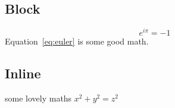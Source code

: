 \documentclass{article}
\begin{document}
  \subsection{Block}

  \begin{equation}
    e^{i\pi}=-1
    \label{eq:euler}
  \end{equation}
  Equation~\ref{eq:euler} is some good math.

  \subsection{Inline}

  some lovely maths \(x^2 + y^2 = z^2\)
\end{document}
